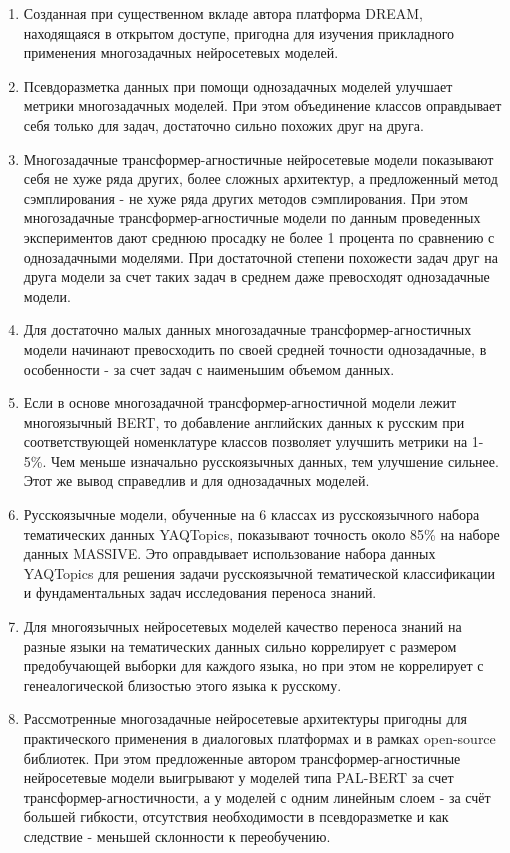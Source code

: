 \begin{enumerate}
  \item {Созданная при существенном вкладе автора платформа DREAM, находящаяся в открытом доступе, пригодна для изучения прикладного применения многозадачных нейросетевых моделей.}
  \item {Псевдоразметка данных при помощи однозадачных моделей улучшает метрики многозадачных моделей. При этом объединение классов оправдывает себя только для задач, достаточно сильно похожих друг на друга.}
  \item {Многозадачные трансформер-агностичные нейросетевые модели показывают себя не хуже ряда других, более сложных архитектур, а предложенный метод сэмплирования - не хуже ряда других методов сэмплирования. При этом многозадачные трансформер-агностичные модели по данным проведенных экспериментов дают среднюю просадку не более 1 процента по сравнению с однозадачными моделями. При достаточной степени похожести задач друг на друга модели за счет таких задач в среднем даже превосходят однозадачные модели.}
  \item {Для достаточно малых данных многозадачные трансформер-агностичных модели начинают превосходить по своей средней точности однозадачные, в особенности - за счет задач с наименьшим объемом данных.}
  \item {Если в основе многозадачной трансформер-агностичной модели лежит многоязычный BERT, то добавление английских данных к русским при соответствующей номенклатуре классов позволяет улучшить метрики на 1-5\%. Чем меньше изначально русскоязычных данных, тем улучшение сильнее. Этот же вывод справедлив и для однозадачных моделей.}
  \item {Русскоязычные модели, обученные на 6 классах из русскоязычного набора тематических данных YAQTopics, показывают точность около 85\% на наборе данных MASSIVE. Это оправдывает использование набора данных YAQTopics для решения задачи русскоязычной тематической классификации и фундаментальных задач исследования переноса знаний.}
  \item {Для многоязычных нейросетевых моделей качество переноса знаний на разные языки на тематических данных сильно коррелирует с размером предобучающей выборки для каждого языка, но при этом не коррелирует с генеалогической близостью этого языка к русскому.}
  \item {Рассмотренные многозадачные нейросетевые архитектуры пригодны для практического применения в диалоговых платформах и в рамках open-source библиотек. При этом предложенные автором трансформер-агностичные нейросетевые модели выигрывают у моделей типа PAL-BERT за счет трансформер-агностичности, а у моделей с одним линейным слоем - за счёт большей гибкости, отсутствия необходимости в псевдоразметке и как следствие - меньшей склонности к переобучению.}
\end{enumerate}



